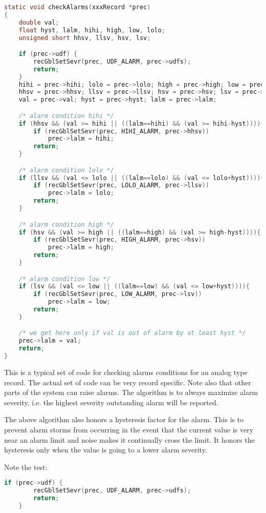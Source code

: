 \begin{lstlisting}[language=C]
static void checkAlarms(xxxRecord *prec)
{
    double val;
    float hyst, lalm, hihi, high, low, lolo;
    unsigned short hhsv, llsv, hsv, lsv;

    if (prec->udf) {
        recGblSetSevr(prec, UDF_ALARM, prec->udfs);
        return;
    }
    hihi = prec->hihi; lolo = prec->lolo; high = prec->high; low = prec->low;
    hhsv = prec->hhsv; llsv = prec->llsv; hsv = prec->hsv; lsv = prec->lsv;
    val = prec->val; hyst = prec->hyst; lalm = prec->lalm;

    /* alarm condition hihi */
    if (hhsv && (val >= hihi || ((lalm==hihi) && (val >= hihi-hyst)))){
        if (recGblSetSevr(prec, HIHI_ALARM, prec->hhsv))
            prec->lalm = hihi;
        return;
    }

    /* alarm condition lolo */
    if (llsv && (val <= lolo || ((lalm==lolo) && (val <= lolo+hyst)))){
        if (recGblSetSevr(prec, LOLO_ALARM, prec->llsv))
            prec->lalm = lolo;
        return;
    }

    /* alarm condition high */
    if (hsv && (val >= high || ((lalm==high) && (val >= high-hyst)))){
        if (recGblSetSevr(prec, HIGH_ALARM, prec->hsv))
            prec->lalm = high;
        return;
    }

    /* alarm condition low */
    if (lsv && (val <= low || ((lalm==low) && (val <= low+hyst)))){
        if (recGblSetSevr(prec, LOW_ALARM, prec->lsv))
            prec->lalm = low;
        return;
    }

    /* we get here only if val is out of alarm by at least hyst */
    prec->lalm = val;
    return;
}
\end{lstlisting}

This is a typical set of code for checking alarms conditions for an analog type record.
The actual set of code can be very record specific.
Note also that other parts of the system can raise alarms.
The algorithm is to always maximize alarm severity, i.e. the highest severity outstanding alarm will be reported.

The above algorithm also honors a hysteresis factor for the alarm.
This is to prevent alarm storms from occurring in the event that the current value is very near an alarm limit and noise makes it continually cross the limit.
It honors the hysteresis only when the value is going to a lower alarm severity.

Note the test:

\begin{lstlisting}[language=C]
    if (prec->udf) {
        recGblSetSevr(prec, UDF_ALARM, prec->udfs);
        return;
    }
\end{lstlisting}

